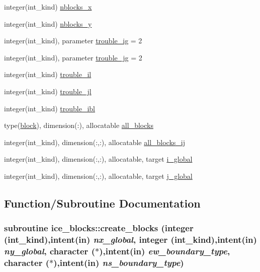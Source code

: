 \begin{DoxyCompactItemize}
\item 
integer(int\_\-kind) \hyperlink{namespaceice__blocks_a9b21bc42a54bcb4a87b28e91dcd90868}{nblocks\_\-x}
\item 
integer(int\_\-kind) \hyperlink{namespaceice__blocks_ab17b5f72b3e734e10c8e896fff833b5c}{nblocks\_\-y}
\item 
integer(int\_\-kind), parameter \hyperlink{namespaceice__blocks_a28a352083c6fc77c5dc4ba8acb9a1eb5}{trouble\_\-ig} = 2
\item 
integer(int\_\-kind), parameter \hyperlink{namespaceice__blocks_a508d64694caacafbc0b551ebd1340c4a}{trouble\_\-jg} = 2
\item 
integer(int\_\-kind) \hyperlink{namespaceice__blocks_a8da713bec362fba640a38ca450162cfd}{trouble\_\-il}
\item 
integer(int\_\-kind) \hyperlink{namespaceice__blocks_a50ca28a3bb76af2138eaf1bcedbd277f}{trouble\_\-jl}
\item 
integer(int\_\-kind) \hyperlink{namespaceice__blocks_a10098396d200773e0d7ebe723e6226e5}{trouble\_\-ibl}
\item 
type(\hyperlink{typeice__blocks_1_1block}{block}), dimension(:), allocatable \hyperlink{namespaceice__blocks_a29dbac203a4f7066fd7d3774c79cb455}{all\_\-blocks}
\item 
integer(int\_\-kind), dimension(:,:), allocatable \hyperlink{namespaceice__blocks_a688487df478314a2bfdd431e7fd741f2}{all\_\-blocks\_\-ij}
\item 
integer(int\_\-kind), dimension(:,:), allocatable, target \hyperlink{namespaceice__blocks_a5a6a14070030778ba9fcbcaa8dc2fb0d}{i\_\-global}
\item 
integer(int\_\-kind), dimension(:,:), allocatable, target \hyperlink{namespaceice__blocks_aabcbed07b689eed9c35b22f738006217}{j\_\-global}
\end{DoxyCompactItemize}


\subsection{Function/Subroutine Documentation}
\hypertarget{namespaceice__blocks_aa2c09eaaef43d9cec6c1596979935f76}{
\subsubsection[{create\_\-blocks}]{\setlength{\rightskip}{0pt plus 5cm}subroutine ice\_\-blocks::create\_\-blocks (integer (int\_\-kind),intent(in) {\em nx\_\-global}, \/  integer (int\_\-kind),intent(in) {\em ny\_\-global}, \/  character ($\ast$),intent(in) {\em ew\_\-boundary\_\-type}, \/  character ($\ast$),intent(in) {\em ns\_\-boundary\_\-type})}}
\label{namespaceice__blocks_aa2c09eaaef43d9cec6c1596979935f76}


